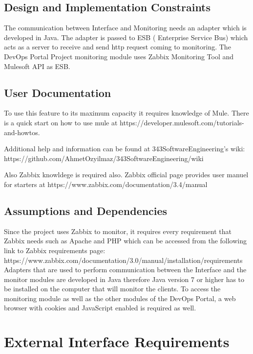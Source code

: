 \documentclass{article}
\begin{document}
\subsection{Design and Implementation Constraints}

  The communication between Interface and Monitoring needs an adapter which is developed in Java. The adapter is passed to ESB ( Enterprise Service Bus) which acts as a server to receive and send http request coming to monitoring. The DevOps Portal Project monitoring module uses Zabbix Monitoring Tool and Mulesoft API as ESB.


\subsection{User Documentation}

To use this feature to its maximum capacity it requires knowledge of Mule. There is a quick start on how to use mule at 
\newline https://developer.mulesoft.com/tutorials-and-howtos. 

\newline Additional help and information can be found at 343SoftwareEngineering’s wiki: \newline https://github.com/AhmetOzyilmaz/343SoftwareEngineering/wiki
 
Also Zabbix knowldege is required also. Zabbix official page provides user manuel for starters at https://www.zabbix.com/documentation/3.4/manual

\subsection{Assumptions and Dependencies}
Since the project uses Zabbix to monitor, it requires every requirement that Zabbix needs such as Apache and PHP which can be accessed from the following link to Zabbix requirements page:
https://www.zabbix.com/documentation/3.0/manual/installation/requirements
Adapters that are used to perform communication between the Interface and the monitor modules are developed in Java therefore Java version 7 or higher has to be installed on the computer that will monitor the clients. 
To access the monitoring module as well as the other modules of the DevOps Portal, a web browser with cookies and JavaScript enabled is required as well.

\section{External Interface Requirements}
\end{document}
